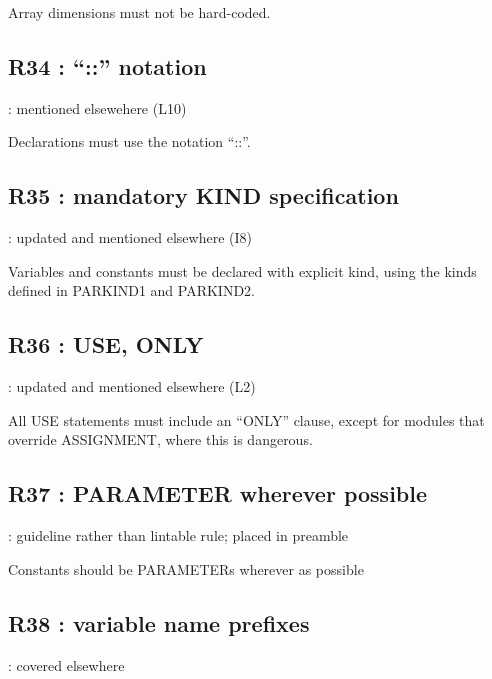 \documentclass[letterpaper,10pt,english]{sphinxmanual}
\begin{document}
Array dimensions must not be hard-coded.


\subsection{R34 : “::” notation}
\label{\detokenize{obsolescent/r34:r34-notation}}\label{\detokenize{obsolescent/r34::doc}}
 : mentioned elsewehere (L10)

Declarations must use the notation “::”.


\subsection{R35 : mandatory KIND specification}
\label{\detokenize{obsolescent/r35:r35-mandatory-kind-specification}}\label{\detokenize{obsolescent/r35::doc}}
 : updated and mentioned elsewhere (I8)

Variables and constants must be declared with explicit kind, using the kinds defined
in PARKIND1 and PARKIND2.


\subsection{R36 :  USE, ONLY}
\label{\detokenize{obsolescent/r36:r36-use-only}}\label{\detokenize{obsolescent/r36::doc}}
 : updated and mentioned elsewhere (L2)

All USE statements must include an “ONLY” clause, except for modules that override ASSIGNMENT,
where this is dangerous.


\subsection{R37 : PARAMETER wherever possible}
\label{\detokenize{obsolescent/r37:r37-parameter-wherever-possible}}\label{\detokenize{obsolescent/r37::doc}}
 : guideline rather than lintable rule; placed in preamble

Constants should be PARAMETERs wherever as possible


\subsection{R38 :  variable name prefixes}
\label{\detokenize{obsolescent/r38:r38-variable-name-prefixes}}\label{\detokenize{obsolescent/r38::doc}}
 : covered elsewhere
\end{document}
